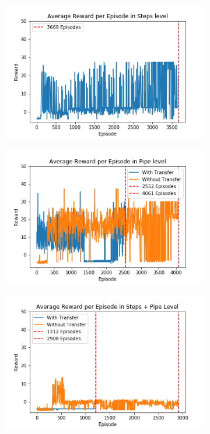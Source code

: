 \documentclass[notitlepage,a4paper,11pt]{article}
\begin{document}
\begin{figure}[t]
     \centering
     \begin{subfigure}[t]{0.32\textwidth}
         \centering
         \includegraphics[width=\textwidth]{figs/oc_results_1.png}
         \caption{}
         \label{fig:oc_results_1}
     \end{subfigure}
     \hfill
     \begin{subfigure}[t]{0.32\textwidth}
         \centering
         \includegraphics[width=\textwidth]{figs/oc_results_2.png}
         \caption{}
         \label{fig:oc_results_2}
     \end{subfigure}
     \hfill
     \begin{subfigure}[t]{0.32\textwidth}
         \centering
         \includegraphics[width=\textwidth]{figs/oc_results_3.png}

\end{subfigure}
\end{figure}
\end{document}
